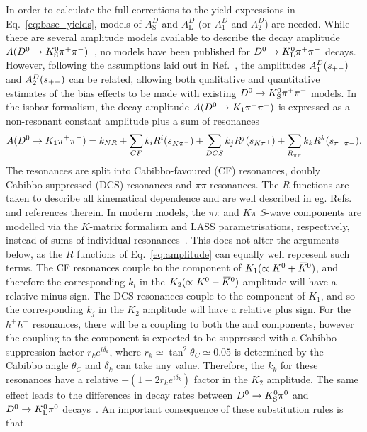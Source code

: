 In order to calculate the full corrections to the yield expressions in Eq.~\eqref{eq:base_yields}, models of $A_\text{S}^D$ and $A_\text{L}^D$ (or $A_\text{1}^D$ and $A_\text{2}^D$) are needed. While there are several amplitude models available to describe the decay amplitude $A({{D}^0}\rightarrow{\ensuremath{{K}^0_{\mathrm{S}}}}\pi^+\pi^-)$~\cite{BABAR2005,BABAR2008,BABAR2010,BELLE2010,DalitzModel18}, no models have been published for ${{D}^0}\rightarrow{\ensuremath{{K}^0_{\mathrm{L}}}} \pi^+\pi^-$  decays. However, following the assumptions laid out in Ref.~\cite{CLEOCISI}, the amplitudes $A^{D}_1(s_{+-})$ and $A^{D}_2(s_{+-})$ can be related, allowing both qualitative and quantitative estimates of the bias effects to be made with existing ${{D}^0}\rightarrow{\ensuremath{{K}^0_{\mathrm{S}}}}{\ensuremath{{\pi}^+}}{\ensuremath{{\pi}^-}}$ models. In the isobar formalism, the decay amplitude $A({{D}^0}\rightarrow K_1 \pi^+\pi^-)$ is expressed as a non-resonant constant amplitude plus a sum of resonances
\begin{align}\label{eq:amplitude}
    A({{D}^0}\rightarrow K_1 \pi^+\pi^-) = k_{NR} + \sum_{CF} k_i R^i(s_{K\pi^-}) + \sum_{DCS} k_j R^j(s_{K\pi^+}) + \sum_{R_{\pi\pi}} k_k R^k(s_{\pi^+\pi-}).
\end{align}
The resonances are split into Cabibbo-favoured (CF) \Kstarm resonances, doubly Cabibbo-suppressed (DCS) \Kstarp resonances and $\pi\pi$ resonances. The $R$ functions are taken to describe all kinematical dependence and are well described in eg. Refs.~\cite{BABAR2005,DalitzModel18} and references therein. In modern models, the $\pi\pi$ and $K\pi$ $S$-wave components are modelled via the $K$-matrix formalism and LASS parametrisations, respectively, instead of sums of individual resonances~\cite{DalitzModel18}. This does not alter the arguments below, as the $R$ functions of Eq.~\eqref{eq:amplitude} can equally well represent such terms. The CF resonances couple to the \Kzb component of $K_1(\propto {\ensuremath{{K}^0}}+{{\kern 0.18em\overline{\kern -0.18em K}}{}^0})$, and therefore the corresponding $k_i$ in the $K_2(\propto {\ensuremath{{K}^0}}-{{\kern 0.18em\overline{\kern -0.18em K}}{}^0})$ amplitude will have a relative minus sign. The DCS resonances couple to the \Kz component of $K_1$, and so the corresponding $k_j$ in the $K_2$ amplitude will have a relative plus sign. For the $h^+h^-$ resonances, there will be a coupling to both the \Kz and \Kzb components, however the coupling to the \Kz component is expected to be suppressed with a Cabibbo suppression factor $r_ke^{i\delta_k}$, where $r_k\simeq\tan^2\theta_C \simeq 0.05$ is determined by the Cabibbo angle $\theta_C$ and $\delta_k$ can take any value.  Therefore, the $k_k$ for these resonances have a relative $-(1-2r_ke^{i\delta_k})$ factor in the $K_2$ amplitude. The same effect leads to the differences in decay rates between ${{D}^0}\rightarrow{\ensuremath{{K}^0_{\mathrm{S}}}}{\ensuremath{{\pi}^0}}$ and ${{D}^0}\rightarrow{\ensuremath{{K}^0_{\mathrm{L}}}}{\ensuremath{{\pi}^0}}$ decays~\cite{TanThetaCTheory,TanThetaCCLEO}. An important consequence of these substitution rules is that
